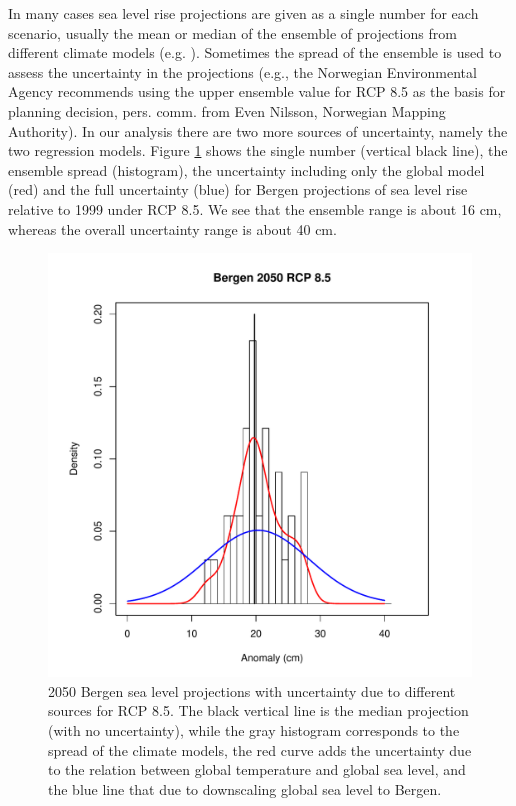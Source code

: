 \documentclass[draft,linenumbers]{agujournal}
\begin{document}
In many cases sea level rise projections are given as a single number for each scenario, usually the mean or median of the ensemble of projections from different climate models (e.g. \citet{climateimpactgroup}). Sometimes the spread of the ensemble is used to assess the uncertainty in the projections (e.g., the Norwegian Environmental Agency recommends using the upper ensemble value for RCP 8.5 as the basis for planning decision, pers. comm. from Even Nilsson, Norwegian Mapping Authority). In our analysis there are two more sources of uncertainty, namely the two regression models. Figure \ref{fig:unc} shows the single number (vertical black line), the ensemble spread (histogram), the uncertainty including only the global model (red) and the full uncertainty (blue) for Bergen projections of sea level rise relative to 1999 under RCP 8.5. We see that the ensemble range is about 16 cm, whereas the overall uncertainty range is about 40 cm.


\begin{figure}[!hbpt]
\begin{center}
\includegraphics[width=0.5\linewidth]{unc.pdf}
\caption{2050 Bergen sea level projections with uncertainty due to different sources for RCP 8.5. The black vertical line is the median projection (with no uncertainty), while the gray histogram corresponds to the spread of the climate models, the red curve adds the uncertainty due to the relation between global temperature and global sea level, and the blue line that due to downscaling global sea level to Bergen. } 
\label{fig:unc}
\end{center}
\end{figure}
\end{document}
